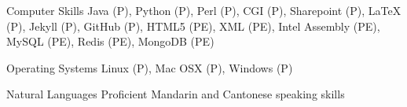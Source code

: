 


\begin{cvskills}


\cvskill
{Computer Skills} %
{Java (P), Python (P), Perl (P), CGI (P), Sharepoint (P), LaTeX (P), Jekyll (P), GitHub (P), HTML5 (PE), XML (PE), Intel Assembly (PE), MySQL (PE), Redis (PE), MongoDB (PE)} %




\cvskill
{Operating Systems} %
{Linux (P), Mac OSX (P), Windows (P)} %


\cvskill
{Natural Languages} %
{Proficient Mandarin and Cantonese speaking skills} %


\end{cvskills}